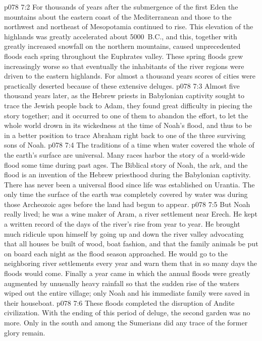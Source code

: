 \vs p078 7:2 For thousands of years after the submergence of the first Eden the mountains about the eastern coast of the Mediterranean and those to the northwest and northeast of Mesopotamia continued to rise. This elevation of the highlands was greatly accelerated about 5000~B.C., and this, together with greatly increased snowfall on the northern mountains, caused unprecedented floods each spring throughout the Euphrates valley. These spring floods grew increasingly worse so that eventually the inhabitants of the river regions were driven to the eastern highlands. For almost a thousand years scores of cities were practically deserted because of these extensive deluges.
\pc \vs p078 7:3 Almost five thousand years later, as the Hebrew priests in Babylonian captivity sought to trace the Jewish people back to Adam, they found great difficulty in piecing the story together; and it occurred to one of them to abandon the effort, to let the whole world drown in its wickedness at the time of Noah’s flood, and thus to be in a better position to trace Abraham right back to one of the three surviving sons of Noah.
\vs p078 7:4 The traditions of a time when water covered the whole of the earth’s surface are universal. Many races harbor the story of a world\hyp{}wide flood some time during past ages. The Biblical story of Noah, the ark, and the flood is an invention of the Hebrew priesthood during the Babylonian captivity. There has never been a universal flood since life was established on Urantia. The only time the surface of the earth was completely covered by water was during those Archeozoic ages before the land had begun to appear.
\vs p078 7:5 But Noah really lived; he was a wine maker of Aram, a river settlement near Erech. He kept a written record of the days of the river’s rise from year to year. He brought much ridicule upon himself by going up and down the river valley advocating that all houses be built of wood, boat fashion, and that the family animals be put on board each night as the flood season approached. He would go to the neighboring river settlements every year and warn them that in so many days the floods would come. Finally a year came in which the annual floods were greatly augmented by unusually heavy rainfall so that the sudden rise of the waters wiped out the entire village; only Noah and his immediate family were saved in their houseboat.\plusone
\pc \vs p078 7:6 These floods completed the disruption of Andite civilization. With the ending of this period of deluge, the second garden was no more. Only in the south and among the Sumerians did any trace of the former glory remain.
